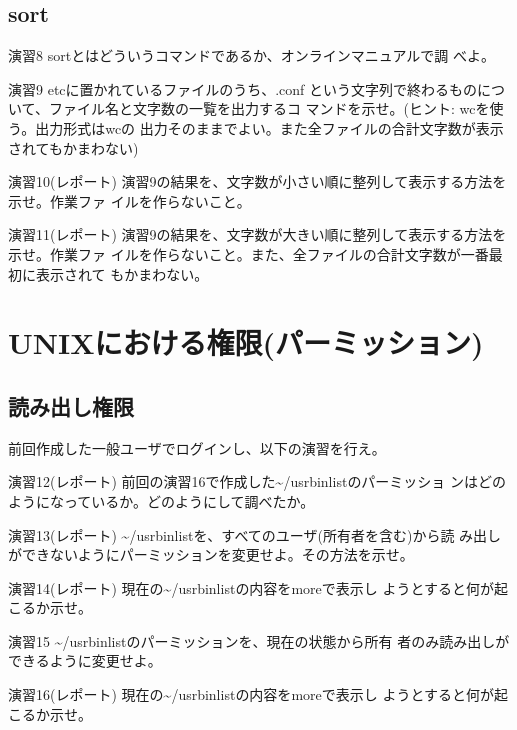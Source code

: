 \documentclass[a4j,10pt]{jarticle}
\begin{document}
\subsection{sort}
\begin{itembox}{演習8}
 {\sffamily sort}とはどういうコマンドであるか、オンラインマニュアルで調
 べよ。
\end{itembox}
\begin{itembox}{演習9}
 {\sffamily {\slash}etc}に置かれているファイルのうち、{\sffamily .conf}
 という文字列で終わるものについて、ファイル名と文字数の一覧を出力するコ
 マンドを示せ。(ヒント: {\sffamily wc}を使う。出力形式は{\sffamily wc}の
 出力そのままでよい。また全ファイルの合計文字数が表示されてもかまわない)
\end{itembox}
\begin{itembox}{演習10(レポート)}
 演習9の結果を、文字数が小さい順に整列して表示する方法を示せ。作業ファ
 イルを作らないこと。
\end{itembox}
\begin{itembox}{演習11(レポート)}
 演習9の結果を、文字数が大きい順に整列して表示する方法を示せ。作業ファ
 イルを作らないこと。また、全ファイルの合計文字数が一番最初に表示されて
 もかまわない。
\end{itembox}

\section{UNIXにおける権限(パーミッション)}
\subsection{読み出し権限}
前回作成した一般ユーザでログインし、以下の演習を行え。
\begin{itembox}{演習12(レポート)}
 前回の演習16で作成した{\sffamily \~{}{\slash}usrbinlist}のパーミッショ
ンはどのようになっているか。どのようにして調べたか。
\end{itembox}
\begin{itembox}{演習13(レポート)}
 {\sffamily \~{}{\slash}usrbinlist}を、すべてのユーザ(所有者を含む)から読
 み出しができないようにパーミッションを変更せよ。その方法を示せ。
\end{itembox}
\begin{itembox}{演習14(レポート)}
 現在の{\sffamily \~{}{\slash}usrbinlist}の内容を{\sffamily more}で表示し
 ようとすると何が起こるか示せ。
\end{itembox}
\begin{itembox}{演習15}
 {\sffamily \~{}{\slash}usrbinlist}のパーミッションを、現在の状態から所有
 者のみ読み出しができるように変更せよ。
\end{itembox}
\begin{itembox}{演習16(レポート)}
 現在の{\sffamily \~{}{\slash}usrbinlist}の内容を{\sffamily more}で表示し
 ようとすると何が起こるか示せ。
\end{itembox}
\end{document}
